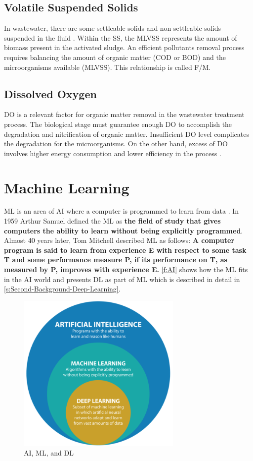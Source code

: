 \subsection{Volatile Suspended Solids}
In wastewater, there are some settleable solids and non-settleable solids suspended in the fluid \cite{Wiesmann2007}. Within the \ac{SS}, the \ac{MLVSS} represents the amount of biomass present in the activated sludge. An efficient pollutants removal process requires balancing the amount of organic matter (\ac{COD} or \ac{BOD}) and the microorganisms available (\ac{MLVSS}). This relationship is called F/M.

\subsection{Dissolved Oxygen}
\ac{DO} is a relevant factor for organic matter removal in the wastewater treatment process. The biological stage must guarantee enough \ac{DO} to accomplish the degradation and nitrification of organic matter. Insufficient \ac{DO} level complicates the degradation for the microorganisms. On the other hand, excess of \ac{DO} involves higher energy consumption and lower efficiency in the process \cite{Zhao2021}. 

\section{Machine Learning}
\label{s:Second-Background-Topic}

\ac{ML} is an area of \ac{AI} where a computer is programmed to learn from data \cite{Ray2019}. In 1959 Arthur Samuel defined the \ac{ML} as \textbf{the field of study that gives computers the ability to learn without being explicitly programmed}. Almost 40 years later, Tom Mitchell described \ac{ML} as follows: \textbf{A computer program is said to learn from experience E with respect to some task T and some performance measure P, if its performance on T, as measured by P, improves with experience E.} \autoref{f:AI} shows how the \ac{ML} fits in the \ac{AI} world and presents \ac{DL} as part of \ac{ML} which is described in detail in \autoref{s:Second-Background-Deep-Learning}.

\begin{figure}[h]
\centering
\includegraphics[width=8cm]{figures/Ch2/AI-ML-DL.png}
\caption{AI, ML, and DL \cite{raza_cinquergrana_2018}}
\label{f:AI}
\end{figure}

